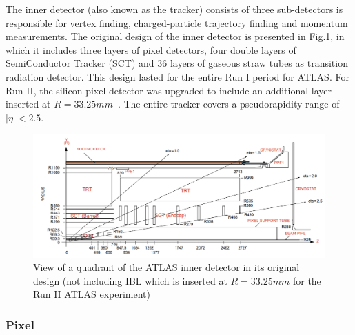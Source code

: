 \label{sec:detector-id}

The inner detector (also known as the tracker) consists of three sub-detectors is responsible for vertex finding, charged-particle trajectory finding and momentum measurements. The original design of the inner detector is presented in Fig.\ref{fig:detector-id}, in which it includes three layers of pixel detectors, four double layers of SemiConductor Tracker (SCT) and 36 layers of gaseous straw tubes as transition radiation detector. This design lasted for the entire Run I period for ATLAS. For Run II, the silicon pixel detector was upgraded to include an additional layer inserted at $R=33.25mm$~\cite{CERN-LHCC-2010-013}. The entire tracker covers a pseudorapidity range of $|\eta|<2.5$.


\begin{figure}[htpb!]
\begin{center}
  \includegraphics[width=0.9\linewidth]{figures/detector/ID}
\caption{View of a quadrant of the ATLAS inner detector in its original design (not including IBL which is inserted at $R=33.25mm$ for the Run II ATLAS experiment) \cite{SCTpaper}}
\label{fig:detector-id}
\end{center}
\end{figure}



\subsubsection{Pixel}

